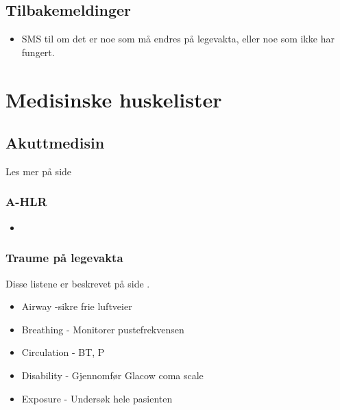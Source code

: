 	\section{Tilbakemeldinger}\label{sec:elv_feedbk}
		\begin{itemize}
			\item SMS til \pawmob{} om det er noe som må endres på legevakta, eller noe som ikke har fungert.
		\end{itemize}

\newpage
\chapter{Medisinske huskelister}
	\section{Akuttmedisin}
		Les mer på side \pageref{chap:desc_chk_akuttmed}
		\subsection{A-HLR}
			\begin{itemize}
				\item
			\end{itemize}
		\subsection{Traume på legevakta}\label{sec:med_traum}
			Disse listene er beskrevet på side \pageref{sec:desc_chk_traume}.
			\begin{itemize}
				\item Airway -sikre frie luftveier\\
				\item Breathing - Monitorer pustefrekvensen\\
				\item Circulation - BT, P \\
				\item Disability - Gjennomfør Glacow coma scale\\
				\item Exposure - Undersøk hele pasienten\\
			\end{itemize}
